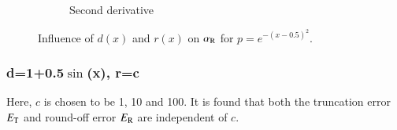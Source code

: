 \documentclass[review,3p]{elsarticle}
\begin{document}
\begin{figure}[!ht]
\begin{subfigure}[b]{0.35\textwidth}
{
}
\vspace{-0.7cm}
\caption{Second derivative}
\label{alpha_R_Poisson_benchmark_2_diff_2_Helm_2ndd}
\end{subfigure}
\caption{Influence of $d(x)$ and $r(x)$ on $\alpha_{\rm R}$ for $p=e^{-(x-0.5)^2}$.}
\label{alpha_R_benchmark_Pois2diff2Helm}
\end{figure}





%
%
%


\subsubsection{d=1+0.5\texorpdfstring{$\sin$(x)}{sin(x)}, r=c}

Here, $c$ is chosen to be 1, 10 and 100. 
It is found that both the truncation error $E_{\rm T}$ and round-off error $E_{\rm R}$ are independent of $c$.
\end{document}
